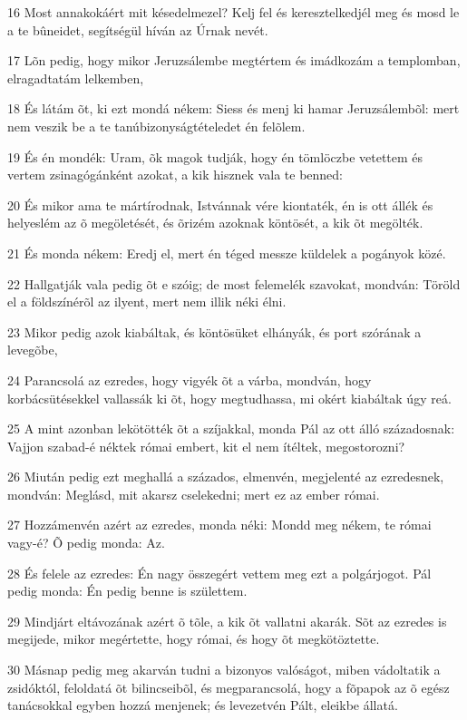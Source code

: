 \par 16 Most annakokáért mit késedelmezel? Kelj fel és keresztelkedjél meg és mosd le a te bûneidet, segítségül híván az Úrnak nevét.
\par 17 Lõn pedig, hogy mikor Jeruzsálembe megtértem és imádkozám a templomban, elragadtatám lelkemben,
\par 18 És látám õt, ki ezt mondá nékem: Siess és menj ki hamar Jeruzsálembõl: mert nem veszik be a te tanúbizonyságtételedet én felõlem.
\par 19 És én mondék: Uram, õk magok tudják, hogy én tömlöczbe vetettem és vertem zsinagógánként azokat, a kik hisznek vala te benned:
\par 20 És mikor ama te mártírodnak, Istvánnak vére kiontaték, én is ott állék és helyeslém az õ megöletését, és õrizém azoknak köntösét, a kik õt megölték.
\par 21 És monda nékem: Eredj el, mert én téged messze küldelek a pogányok közé.
\par 22 Hallgatják vala pedig õt e szóig; de most felemelék szavokat, mondván: Töröld el a földszínérõl az ilyent, mert nem illik néki élni.
\par 23 Mikor pedig azok kiabáltak, és köntösüket elhányák, és port szórának a levegõbe,
\par 24 Parancsolá az ezredes, hogy vigyék õt a várba, mondván, hogy korbácsütésekkel vallassák ki õt, hogy megtudhassa, mi okért kiabáltak úgy reá.
\par 25 A mint azonban lekötötték õt a szíjakkal, monda Pál az ott álló századosnak: Vajjon szabad-é néktek római embert, kit el nem ítéltek, megostorozni?
\par 26 Miután pedig ezt meghallá a százados, elmenvén, megjelenté az ezredesnek, mondván: Meglásd, mit akarsz cselekedni; mert ez az ember római.
\par 27 Hozzámenvén azért az ezredes, monda néki: Mondd meg nékem, te római vagy-é? Õ pedig monda: Az.
\par 28 És felele az ezredes: Én nagy összegért vettem meg ezt a polgárjogot. Pál pedig monda: Én pedig benne is születtem.
\par 29 Mindjárt eltávozának azért õ tõle, a kik õt vallatni akarák. Sõt az ezredes is megijede, mikor megértette, hogy római, és hogy õt megkötöztette.
\par 30 Másnap pedig meg akarván tudni a bizonyos valóságot, miben vádoltatik a zsidóktól, feloldatá õt bilincseibõl, és megparancsolá, hogy a fõpapok az õ egész tanácsokkal egyben hozzá menjenek; és levezetvén Pált, eleikbe állatá.

